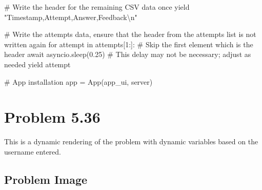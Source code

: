 \documentclass[
  letterpaper,
  DIV=11,
  numbers=noendperiod]{scrreprt}
\newenvironment{Shaded}{\begin{snugshade}}{\end{snugshade}}
\newcommand{\NormalTok}[1]{\textcolor[rgb]{0.00,0.23,0.31}{#1}}
\begin{document}
\begin{Shaded}
\begin{Highlighting}[]
\NormalTok{        \# Write the header for the remaining CSV data once}
\NormalTok{        yield "Timestamp,Attempt,Answer,Feedback\textbackslash{}n"}
        
\NormalTok{        \# Write the attempts data, ensure that the header from the attempts list is not written again}
\NormalTok{        for attempt in attempts[1:]:  \# Skip the first element which is the header}
\NormalTok{            await asyncio.sleep(0.25)  \# This delay may not be necessary; adjust as needed}
\NormalTok{            yield attempt}


\NormalTok{\# App installation}
\NormalTok{app = App(app\_ui, server)}
\end{Highlighting}
\end{Shaded}

\chapter*{Problem 5.36}\label{problem-5.36}


This is a dynamic rendering of the problem with dynamic variables based
on the username entered.

\section*{Problem Image}\label{problem-image-49}

\end{document}
